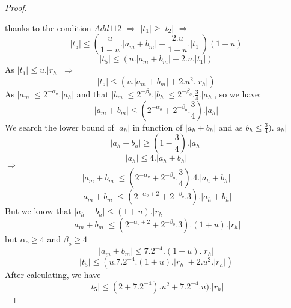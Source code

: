 \begin{proof}
\begin{itemize}
\end{itemize}
thanks to the condition $Add112$ $\Rightarrow$ $\lvert t_1 \rvert \ge \lvert t_2 \rvert$ $\Rightarrow$ 
$$\lvert t_5 \rvert \le (\frac{u}{1-u}. \lvert a_m +b_m \rvert + \frac{2.u}{1-u}. \lvert t_1  \rvert)(1+u)$$
$$\lvert t_5 \rvert \le (u. \lvert a_m +b_m \rvert + 2.u. \lvert t_1  \rvert)$$
As $\lvert t_1 \rvert \le u.\lvert r_h \rvert$ $\Rightarrow$
$$\lvert t_5 \rvert \le (u. \lvert a_m +b_m \rvert + 2.u^2. \lvert r_h  \rvert)$$
As $\lvert a_m \rvert \le 2^{-\alpha_o} .\lvert a_h \rvert$ and that $\lvert b_m \rvert \le 2^{-\beta_o} .\lvert b_h \rvert \le 2^{-\beta_o}.\frac{3}{4}. \lvert a_h \rvert$, so we have:
$$\lvert a_m +b_m \rvert \le (2^{-\alpha_o} +  2^{-\beta_o}.\frac{3}{4}).\lvert a_h \rvert $$
We search the lower bound of $\lvert a_h \rvert$ in function of $\lvert a_h + b_h \rvert$ and as $b_h \le \frac{3}{4}).\lvert a_h \rvert$\\
$$\lvert a_h + b_h \rvert \ge (1 - \frac{3}{4}).\lvert a_h \rvert$$
$$\lvert a_h \rvert \le 4.\lvert a_h + b_h \rvert $$
$\Rightarrow$
$$\lvert a_m +b_m \rvert \le (2^{-\alpha_o} +  2^{-\beta_o}.\frac{3}{4}).4.\lvert a_h + b_h \rvert $$
$$\lvert a_m +b_m \rvert \le (2^{-\alpha_o+2} +  2^{-\beta_o}.3).\lvert a_h + b_h \rvert $$
But we know that $\lvert a_h + b_h \rvert \le (1+u).\lvert r_h \rvert $\\
$$\lvert a_m +b_m \rvert \le (2^{-\alpha_o+2} +  2^{-\beta_o}.3).(1+u).\lvert r_h \rvert$$
but $\alpha_o \ge 4$ and $\beta_o \ge 4$ 
$$\lvert a_m +b_m \rvert \le 7.2^{-4}.(1+u).\lvert r_h \rvert$$
$$\lvert t_5 \rvert \le (u. 7.2^{-4}.(1+u).\lvert r_h \rvert + 2.u^2. \lvert r_h  \rvert)$$
After calculating, we have  
$$\lvert t_5 \rvert \le  (2+7.2^{-4}).u^2+7.2^{-4}.u). \lvert r_h  \rvert$$


\end{proof}
